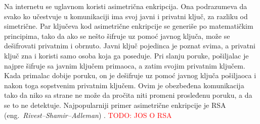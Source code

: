 \documentclass[a4paper]{article}
\newcommand\todos[1]{\textcolor{red}{#1}}
\begin{document}
\par Na internetu se uglavnom koristi asimetrična enkripcija. Ona podrazumeva da svako ko učestvuje u komunikaciji ima svoj javni i privatni ključ, za razliku od simetrične. Par ključeva kod asimetrične enkripcije se generiše po matematičkim principima, tako da ako se nešto šifruje uz pomoć javnog ključa, može se dešifrovati privatnim i obrnuto. Javni ključ pojedinca je poznat svima, a privatni ključ zna i koristi samo osoba koja ga poseduje. Pri slanju poruke, pošiljalac je najpre šifruje sa javnim ključem primaoca, a zatim svojim privatnim ključem. Kada primalac dobije poruku, on je dešifruje uz pomoć javnog ključa pošiljaoca i nakon toga sopstvenim privatnim ključem. Ovim je obezbeđena komunikacija tako da niko sa strane ne može da pročita niti promeni prosleđenu poruku, a da se to ne detektuje. Najpopularniji primer asimetrične enkripcije je RSA (eng.~{\em Rivest–Shamir–Adleman}) \cite{rsa}. \todos{TODO: JOS O RSA} 
\end{document}

